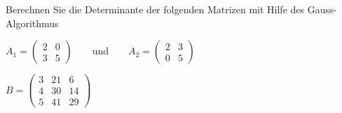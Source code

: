 Berechnen Sie die Determinante der folgenden Matrizen mit Hilfe des
Gauss-Algorithmus
\begin{teilaufgaben}
\item
$
\displaystyle
A_1 = \begin{pmatrix}2&0\\3&5\end{pmatrix}
\qquad\text{und}\qquad
A_2 = \begin{pmatrix}2&3\\0&5\end{pmatrix}
$
\item
$\displaystyle
B=\begin{pmatrix}
3&21& 6\\
4&30&14\\
5&41&29
\end{pmatrix}$
\end{teilaufgaben}

